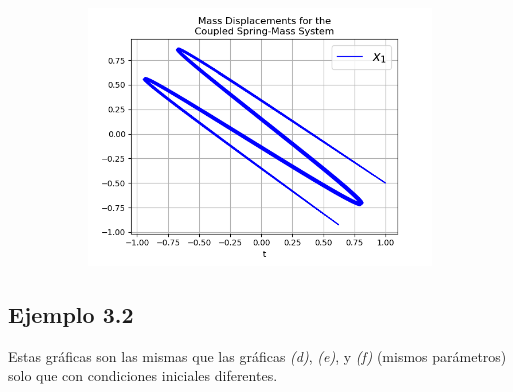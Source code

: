 \documentclass{article}
\begin{document}
\begin{figure}[h!]
\begin{subfigure}[b]{0.45\linewidth}
    \caption{}
  \end{subfigure}
  \begin{subfigure}[b]{0.5\linewidth}
    \includegraphics[width=\linewidth]{two_springs316.png}
    \caption{}
  \end{subfigure}
\end{figure}



\subsection*{Ejemplo 3.2}

Estas gráficas son las mismas que las gráficas \textit{(d)}, \textit{(e)}, y \textit{(f)} (mismos parámetros) solo que con condiciones iniciales diferentes.
\end{document}
